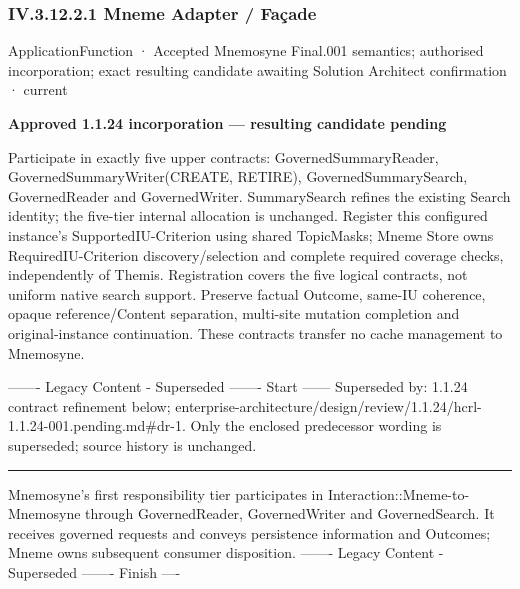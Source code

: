\subsubsection*{IV.3.12.2.1 Mneme Adapter / Façade}
\label{navigation:IV.3.12.2.1}

\label{element:22bdac97fe0d48d1844f1e982d03d387}
{\small ApplicationFunction · Accepted Mnemosyne Final.001 semantics; authorised incorporation; exact resulting candidate awaiting Solution Architect confirmation · current}\par

\par\medskip\textbf{Approved 1.1.24 incorporation — resulting candidate pending}\par


Participate in exactly five upper contracts: GovernedSummaryReader, GovernedSummaryWriter(CREATE, RETIRE), GovernedSummarySearch, GovernedReader and GovernedWriter. SummarySearch refines the existing Search identity; the five-tier internal allocation is unchanged. Register this configured instance's SupportedIU-Criterion using shared TopicMasks; Mneme Store owns RequiredIU-Criterion discovery/selection and complete required coverage checks, independently of Themis. Registration covers the five logical contracts, not uniform native search support. Preserve factual Outcome, same-IU coherence, opaque reference/Content separation, multi-site mutation completion and original-instance continuation. These contracts transfer no cache management to Mnemosyne.



------- Legacy Content - Superseded ------- Start ------
Superseded by: 1.1.24 contract refinement below; enterprise-architecture/design/review/1.1.24/hcrl-1.1.24-001.pending.md\#dr-1.
Only the enclosed predecessor wording is superseded; source history is unchanged.



\medskip\hrule\medskip


Mnemosyne's first responsibility tier participates in Interaction::Mneme-to-Mnemosyne through GovernedReader, GovernedWriter and GovernedSearch. It receives governed requests and conveys persistence information and Outcomes; Mneme owns subsequent consumer disposition.
------- Legacy Content - Superseded ------- Finish ----



